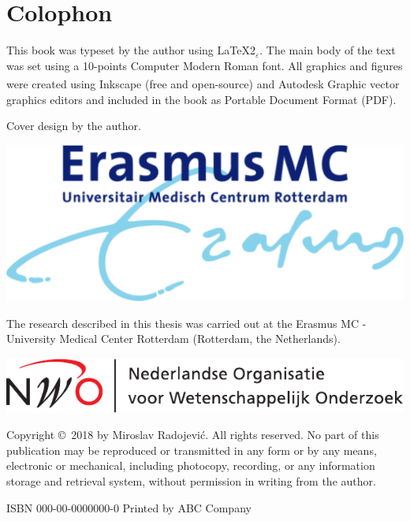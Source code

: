 %
%

\newpage
\setlength{\parindent}{0pt}
\thispagestyle{empty}

\section*{Colophon}

\bigskip
This book was typeset by the author using \LaTeX{}2{\LARGE $_{\varepsilon}$}. The main body of the text was set using a 10-points Computer Modern Roman font. All graphics and figures were created using Inkscape (free and open-source) and Autodesk \textsuperscript{\textregistered}Graphic vector graphics editors and included in the book as Portable Document Format (PDF). %

\bigskip
Cover design by the author.%
\bigskip

\vfill
\includegraphics[height=0.08\textheight]{./logos/emc}

The research described in this thesis was carried out at the Erasmus MC - University Medical Center Rotterdam (Rotterdam, the Netherlands). 
\bigskip

\includegraphics[height=0.07\textheight]{./logos/nwo-nl}

\bigskip

Copyright \copyright\ 2018 by Miroslav Radojevi\'{c}. All rights reserved. No part of this publication may be reproduced or transmitted in any form or by any means, electronic or mechanical, including photocopy, recording, or any information storage and retrieval system, without permission in writing from the author.

\bigskip
ISBN 000-00-0000000-0
\bigskip
Printed by ABC Company
\setlength{\parindent}{\myindent}


